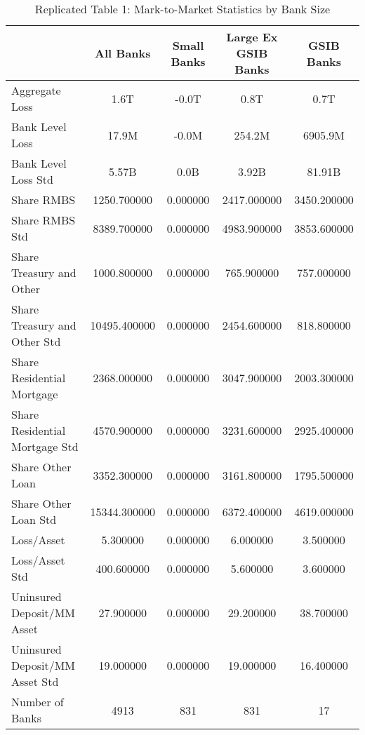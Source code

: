 \begin{table}
\caption{Replicated Table 1: Mark-to-Market Statistics by Bank Size}
\label{tab:replicated1}
\begin{tabular}{lcccc}
\toprule
 & All Banks & Small Banks & Large Ex GSIB Banks & GSIB Banks \\
\midrule
Aggregate Loss & 1.6T & -0.0T & 0.8T & 0.7T \\
Bank Level Loss & 17.9M & -0.0M & 254.2M & 6905.9M \\
Bank Level Loss Std & 5.57B & 0.0B & 3.92B & 81.91B \\
Share RMBS & 1250.700000 & 0.000000 & 2417.000000 & 3450.200000 \\
Share RMBS Std & 8389.700000 & 0.000000 & 4983.900000 & 3853.600000 \\
Share Treasury and Other & 1000.800000 & 0.000000 & 765.900000 & 757.000000 \\
Share Treasury and Other Std & 10495.400000 & 0.000000 & 2454.600000 & 818.800000 \\
Share Residential Mortgage & 2368.000000 & 0.000000 & 3047.900000 & 2003.300000 \\
Share Residential Mortgage Std & 4570.900000 & 0.000000 & 3231.600000 & 2925.400000 \\
Share Other Loan & 3352.300000 & 0.000000 & 3161.800000 & 1795.500000 \\
Share Other Loan Std & 15344.300000 & 0.000000 & 6372.400000 & 4619.000000 \\
Loss/Asset & 5.300000 & 0.000000 & 6.000000 & 3.500000 \\
Loss/Asset Std & 400.600000 & 0.000000 & 5.600000 & 3.600000 \\
Uninsured Deposit/MM Asset & 27.900000 & 0.000000 & 29.200000 & 38.700000 \\
Uninsured Deposit/MM Asset Std & 19.000000 & 0.000000 & 19.000000 & 16.400000 \\
Number of Banks & 4913 & 831 & 831 & 17 \\
\bottomrule
\end{tabular}
\end{table}

